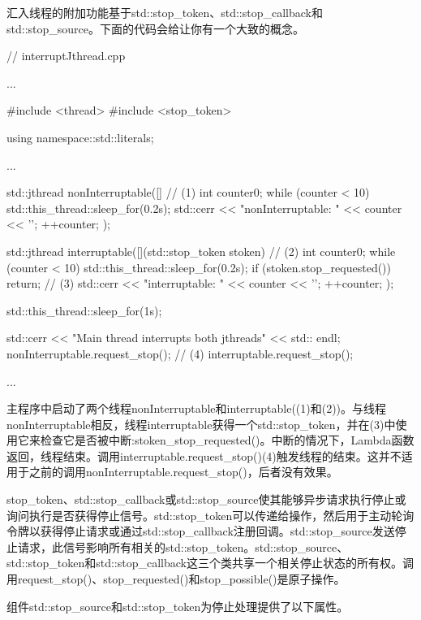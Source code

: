 汇入线程的附加功能基于std::stop\_token、std::stop\_callback和std::stop\_source。下面的代码会给让你有一个大致的概念。


\begin{cpp}
// interruptJthread.cpp

...

#include <thread>
#include <stop_token>

using namespace::std::literals;

...

std::jthread nonInterruptable([]{ // (1)
	int counter{0};
	while (counter < 10){
		std::this_thread::sleep_for(0.2s);
		std::cerr << "nonInterruptable: " << counter << '\n';
		++counter;
	}
});

std::jthread interruptable([](std::stop_token stoken){ // (2)
	int counter{0};
	while (counter < 10){
		std::this_thread::sleep_for(0.2s);
		if (stoken.stop_requested()) return; // (3)
		std::cerr << "interruptable: " << counter << '\n';
		++counter;
	}
});

std::this_thread::sleep_for(1s);

std::cerr << "Main thread interrupts both jthreads" << std:: endl;
nonInterruptable.request_stop(); // (4)
interruptable.request_stop();

...
\end{cpp}

主程序中启动了两个线程nonInterruptable和interruptable((1)和(2))。与线程nonInterruptable相反，线程interruptable获得一个std::stop\_token，并在(3)中使用它来检查它是否被中断:stoken\_stop\_requested()。中断的情况下，Lambda函数返回，线程结束。调用interruptable.request\_stop()(4)触发线程的结束。这并不适用于之前的调用nonInterruptable.request\_stop()，后者没有效果。




stop\_token、std::stop\_callback或std::stop\_source使其能够异步请求执行停止或询问执行是否获得停止信号。std::stop\_token可以传递给操作，然后用于主动轮询令牌以获得停止请求或通过std::stop\_callback注册回调。std::stop\_source发送停止请求，此信号影响所有相关的std::stop\_token。std::stop\_source、std::stop\_token和std::stop\_callback这三个类共享一个相关停止状态的所有权。调用request\_stop()、stop\_requested()和stop\_possible()是原子操作。

组件std::stop\_source和std::stop\_token为停止处理提供了以下属性。

